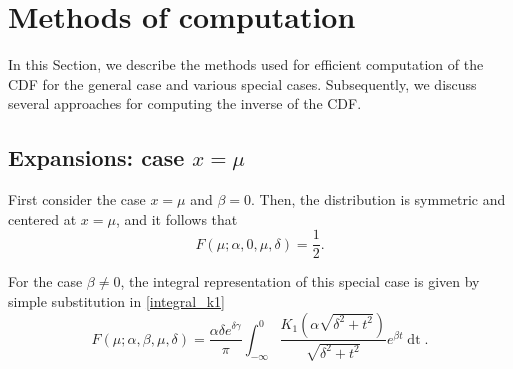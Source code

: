 \documentclass[10pt,a4paper,oneside]{article}
\numberwithin{equation}{section}
\begin{document}
\section{Methods of computation}
In this Section, we describe the methods used for efficient computation of the CDF for the general case and various special cases. Subsequently, we discuss several approaches for computing the inverse of the CDF.

\subsection{Expansions: case $x = \mu$}
First consider the case $x = \mu$ and $\beta = 0$. Then, the distribution is symmetric and centered at $x = \mu$, and it follows that
\begin{equation}
F(\mu; \alpha, 0, \mu, \delta) = \frac{1}{2}.
\end{equation}

For the case $\beta \neq 0$, the integral representation of this special case is given by simple substitution in \eqref{integral_k1}
\begin{equation}\label{integral_k1_x=mu}
F(\mu; \alpha, \beta, \mu, \delta) = \frac{\alpha \delta e^{\delta \gamma}}{\pi} \int_{-\infty}^{0} \frac{K_1\left(\alpha\sqrt{\delta^2 + t^2}\right)}{\sqrt{\delta^2 + t^2}} e^{\beta t} \mathop{dt}.
\end{equation}
\end{document}
